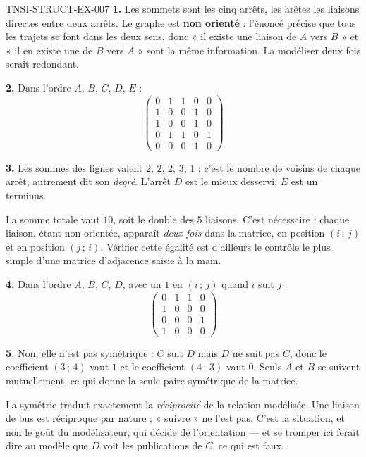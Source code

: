 \begin{corrige}{TNSI-STRUCT-EX-007}
\textbf{1.} Les sommets sont les cinq arrêts, les arêtes les liaisons directes
entre deux arrêts. Le graphe est \textbf{non orienté} : l'énoncé précise que
tous les trajets se font dans les deux sens, donc « il existe une liaison de $A$
vers $B$ » et « il en existe une de $B$ vers $A$ » sont la même information. La
modéliser deux fois serait redondant.

\textbf{2.} Dans l'ordre $A$, $B$, $C$, $D$, $E$ :
\[
  \begin{pmatrix}
    0&1&1&0&0\\
    1&0&0&1&0\\
    1&0&0&1&0\\
    0&1&1&0&1\\
    0&0&0&1&0
  \end{pmatrix}
\]

\textbf{3.} Les sommes des lignes valent $2$, $2$, $2$, $3$, $1$ : c'est le
nombre de voisins de chaque arrêt, autrement dit son \emph{degré}. L'arrêt $D$
est le mieux desservi, $E$ est un terminus.

La somme totale vaut $10$, soit le double des $5$ liaisons. C'est nécessaire :
chaque liaison, étant non orientée, apparaît \emph{deux fois} dans la matrice,
en position $(i\,;\,j)$ et en position $(j\,;\,i)$. Vérifier cette égalité est
d'ailleurs le contrôle le plus simple d'une matrice d'adjacence saisie à la
main.

\textbf{4.} Dans l'ordre $A$, $B$, $C$, $D$, avec un $1$ en $(i\,;\,j)$ quand
$i$ suit $j$ :
\[
  \begin{pmatrix}
    0&1&1&0\\
    1&0&0&0\\
    0&0&0&1\\
    1&0&0&0
  \end{pmatrix}
\]

\textbf{5.} Non, elle n'est pas symétrique : $C$ suit $D$ mais $D$ ne suit pas
$C$, donc le coefficient $(3\,;\,4)$ vaut $1$ et le coefficient $(4\,;\,3)$ vaut
$0$. Seuls $A$ et $B$ se suivent mutuellement, ce qui donne la seule paire
symétrique de la matrice.

La symétrie traduit exactement la \emph{réciprocité} de la relation modélisée.
Une liaison de bus est réciproque par nature ; « suivre » ne l'est pas. C'est la
situation, et non le goût du modélisateur, qui décide de l'orientation — et se
tromper ici ferait dire au modèle que $D$ voit les publications de $C$, ce qui
est faux.


\end{corrige}
